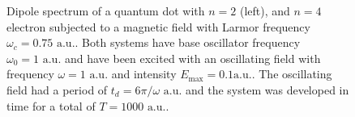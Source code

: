 \begin{figure}[!h]
    \centering
    \caption{Dipole spectrum of a quantum dot with $n=2$ (left), and $n=4$ electron 
    subjected to a magnetic field with Larmor frequency $\omega_c=0.75 \text{ a.u.}$.
    Both systems have base oscillator frequency $\omega_0=1 \text{ a.u.}$ and 
    have been excited with an oscillating field with frequency $\omega = 1 \text{ a.u.}$
    and intensity $E_\text{max} = 0.1 \text{a.u.}$. The oscillating field had a period of 
    $t_d = 6\pi/\omega \text{ a.u.}$ and the system was developed in time for a total 
    of $T = 1000 \text{ a.u.}$.}
    \label{fig:b_omc075}
\end{figure}

